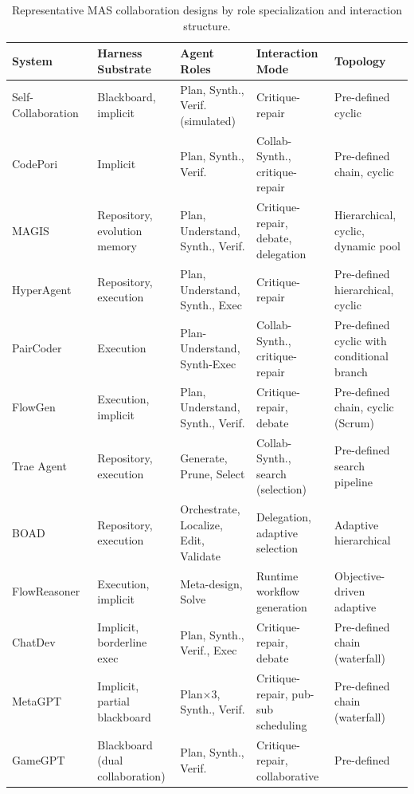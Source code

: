 \begin{table}[t]
\centering
\caption{Representative MAS collaboration designs by role specialization and interaction structure. }
\label{tab:mas_collaboration_systems}
\renewcommand{\arraystretch}{1.16}
\setlength{\tabcolsep}{3.5pt}
\footnotesize
\begin{tabularx}{\textwidth}{@{}
  >{\raggedright\arraybackslash}p{2.55cm}
  >{\raggedright\arraybackslash}p{2.85cm}
  >{\raggedright\arraybackslash}p{3.05cm}
  >{\raggedright\arraybackslash}p{3.05cm}
  >{\raggedright\arraybackslash}X@{}}
\toprule
\textbf{System}
& \textbf{Harness Substrate}
& \textbf{Agent Roles}
& \textbf{Interaction Mode}
& \textbf{Topology} \\
\midrule
Self-Collaboration~\cite{Dong2024SelfCollaboration}
& Blackboard, implicit
& Plan, Synth., Verif. (simulated)
& Critique-repair
& Pre-defined cyclic \\ \midrule
CodePori~\cite{Rasheed2024Codepori}
& Implicit
& Plan, Synth., Verif.
& Collab-Synth., critique-repair
& Pre-defined chain, cyclic \\ \midrule
MAGIS~\cite{Tao2024Magis}
& Repository, evolution memory
& Plan, Understand, Synth., Verif.
& Critique-repair, debate, delegation
& Hierarchical, cyclic, dynamic pool \\ \midrule
HyperAgent~\cite{Phan2024HyperAgent}
& Repository, execution
& Plan, Understand, Synth., Exec
& Critique-repair
& Pre-defined hierarchical, cyclic \\ \midrule
PairCoder~\cite{Zhang2024PairProgramming}
& Execution
& Plan-Understand, Synth-Exec
& Collab-Synth., critique-repair
& Pre-defined cyclic with conditional branch \\ \midrule
FlowGen~\cite{Lin2025Soen101}
& Execution, implicit
& Plan, Understand, Synth., Verif.
& Critique-repair, debate
& Pre-defined chain, cyclic (Scrum) \\ \midrule
Trae Agent~\cite{gao2025traeagent}
& Repository, execution
& Generate, Prune, Select
& Collab-Synth., search (selection)
& Pre-defined search pipeline \\ \midrule
BOAD~\cite{xu2025boad}
& Repository, execution
& Orchestrate, Localize, Edit, Validate
& Delegation, adaptive selection
& Adaptive hierarchical \\ \midrule
FlowReasoner~\cite{gao2025flowreasoner}
& Execution, implicit
& Meta-design, Solve
& Runtime workflow generation
& Objective-driven adaptive \\ \midrule
ChatDev~\cite{Qian2023ChatDev}
& Implicit, borderline exec
& Plan, Synth., Verif., Exec
& Critique-repair, debate
& Pre-defined chain (waterfall) \\ \midrule
MetaGPT~\cite{Hong2023MetaGPT}
& Implicit, partial blackboard
& Plan$\times$3, Synth., Verif.
& Critique-repair, pub-sub scheduling
& Pre-defined chain (waterfall) \\ \midrule
GameGPT~\cite{chen2023gamegpt}
& Blackboard (dual collaboration)
& Plan, Synth., Verif.
& Critique-repair, collaborative
& Pre-defined \\
\bottomrule
\end{tabularx}
\end{table}




